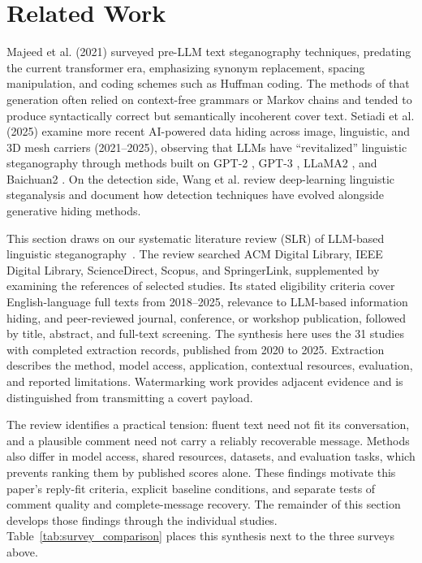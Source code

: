 \section{Related Work}
\label{sec:related_work}

Majeed et al. (2021) \cite{math9212829} surveyed pre-LLM text steganography techniques, predating the current transformer era, emphasizing synonym replacement, spacing manipulation, and coding schemes such as Huffman coding. The methods of that generation often relied on context-free grammars or Markov chains and tended to produce syntactically correct but semantically incoherent cover text. Setiadi et al. (2025) \cite{Setiadi_Ghosal_Sahu_2025} examine more recent AI-powered data hiding across image, linguistic, and 3D mesh carriers (2021--2025), observing that LLMs have ``revitalized'' linguistic steganography through methods built on GPT-2 \cite{radford2019gpt2}, GPT-3 \cite{brown2020language}, LLaMA2 \cite{touvron2023llama2}, and Baichuan2 \cite{xiao2024baichuan2}. On the detection side, Wang et al. \cite{Wang_2023} review deep-learning linguistic steganalysis and document how detection techniques have evolved alongside generative hiding methods.

This section draws on our systematic literature review (SLR) of LLM-based linguistic steganography~\cite{olabi2026slr}. The review searched ACM Digital Library, IEEE Digital Library, ScienceDirect, Scopus, and SpringerLink, supplemented by examining the references of selected studies. Its stated eligibility criteria cover English-language full texts from 2018--2025, relevance to LLM-based information hiding, and peer-reviewed journal, conference, or workshop publication, followed by title, abstract, and full-text screening. The synthesis here uses the 31 studies with completed extraction records, published from 2020 to 2025. Extraction describes the method, model access, application, contextual resources, evaluation, and reported limitations. Watermarking work provides adjacent evidence and is distinguished from transmitting a covert payload.

The review identifies a practical tension: fluent text need not fit its conversation, and a plausible comment need not carry a reliably recoverable message. Methods also differ in model access, shared resources, datasets, and evaluation tasks, which prevents ranking them by published scores alone. These findings motivate this paper's reply-fit criteria, explicit baseline conditions, and separate tests of comment quality and complete-message recovery. The remainder of this section develops those findings through the individual studies.
Table~\ref{tab:survey_comparison} places this synthesis next to the three surveys above.

